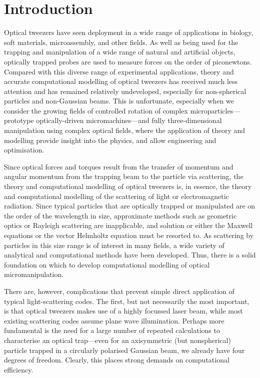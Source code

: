 \section{Introduction}

Optical tweezers have seen deployment in a wide range of applications
in biology, soft materials, microassembly, and other fields.
As well as being used
for the trapping and manipulation of a wide range of natural and artificial
objects, optically trapped probes are used to measure forces on the order
of piconewtons. Compared with this diverse range of experimental applications,
theory and accurate computational modelling of optical tweezers has received
much less attention and has remained relatively undeveloped, especially for
non-spherical particles and non-Gaussian beams. This is unfortunate,
especially when we consider the growing
fields of controlled rotation of complex microparticles---prototype
optically-driven micromachines---and fully three-dimensional
manipulation using complex optical fields, where
the application of theory and modelling provide insight into the
physics, and allow engineering and optimisation.

Since optical forces and torques result
from the transfer of momentum and angular momentum from the trapping
beam to the particle via scattering, the theory and computational
modelling of optical tweezers is, in essence, the theory and computational
modelling of the scattering of light or electromagnetic radiation.
Since typical particles that are
optically trapped or manipulated are on the order of the
wavelength in size, approximate methods such as geometric
optics or Rayleigh scattering are inapplicable, and solution
or either the Maxwell equations or the vector Helmholtz equation
must be resorted to. As scattering by particles in this size
range is of interest in many fields, a wide variety of analytical
and computational methods have been developed. Thus, there is
a solid foundation on which to develop computational modelling
of optical micromanipulation.

There are, however, complications that prevent simple direct application of
typical light-scattering codes. The first, but not necessarily the
most important, is that optical tweezers
makes use of a highly focussed laser beam, while most existing scattering
codes assume plane wave illumination. Perhaps more fundamental is the
need for a large number of repeated calculations to characterise an
optical trap---even for an axisymmetric (but nonspherical) particle trapped
in a circularly polarised Gaussian beam, we already have four degrees
of freedom. Clearly, this places strong demands on computational
efficiency.


